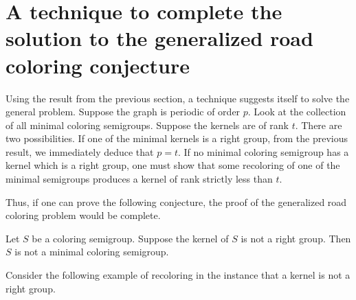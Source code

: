 

\section{A technique to complete the solution to the generalized road coloring conjecture}  
\label{sec:4.6}

Using the result from the previous section, a technique suggests itself to solve the general problem.  
Suppose the graph is periodic of order $p$.  
Look at the collection of all minimal coloring semigroups.  
Suppose the kernels are of rank $t$.  
There are two possibilities.  
If one of the minimal kernels is a right group, from the previous result, we immediately deduce that $p=t$.  
If no minimal coloring semigroup has a kernel which is a right group, one must show that some recoloring of one of the minimal semigroups produces a kernel of rank strictly less than $t$.  

Thus, if one can prove the following conjecture, the proof of the generalized road coloring problem would be complete.

\begin{conjecture} 	\label{con:4.2}
Let $S$ be a coloring semigroup.  
Suppose the kernel of $S$ is not a right group.  
Then $S$ is not a minimal coloring semigroup.
\end{conjecture}

Consider the following example of recoloring in the instance that a kernel is not a right group.


